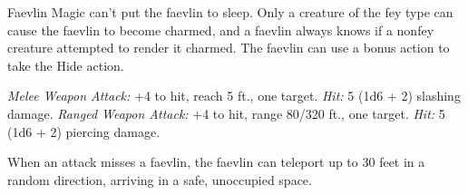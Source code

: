 \documentclass[10pt,a4paper,twoside,twocolumn,openany,bg=print,nodeprecatedcode]{dndbook}
\begin{document}
\begin{DndMonster}[float*=t]{Faevlin}
\DndMonsterBasics[
armor-class = {15 (leather armor)},
hit-points = {\DndDice{3d6}},
speed = {30 ft.}
]
\DndMonsterAbilityScores[
 str = 8,
 dex = 14,
 con = 10,
 int = 10,
 wis = 12,
 cha = 11
]
\DndMonsterDetails[
skills = {Stealth +4},
senses = {darkvision 60 ft., passive perception 11},
languages = {Goblin, Sylvan},
challenge = 1/4,
]
Magic can't put the faevlin to sleep. Only a creature of the fey type can cause the faevlin to become charmed, and a faevlin always knows if a nonfey creature attempted to render it charmed.
The faevlin can use a bonus action to take the Hide action.
\par
{}
\textsl{Melee Weapon Attack:} +4 to hit, reach 5 ft., one target. \textsl{Hit:} 5 (1d6 + 2) slashing damage.
\textsl{Ranged Weapon Attack:} +4 to hit, range 80/320 ft., one target. \textsl{Hit:} 5 (1d6 + 2) piercing damage.
\par
{}
When an attack misses a faevlin, the faevlin can teleport up to 30 feet in a random direction, arriving in a safe, unoccupied space.
\end{DndMonster}
\end{document}

